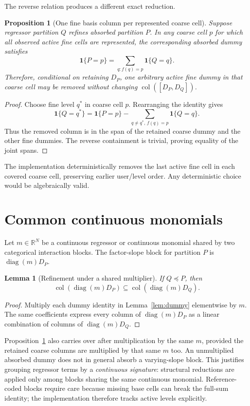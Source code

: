 \documentclass[11pt]{article}
\newtheorem{proposition}[theorem]{Proposition}
\newtheorem{lemma}[theorem]{Lemma}
\theoremstyle{definition}
\newcommand{\R}{\mathbb{R}}
\newcommand{\col}{\operatorname{col}}
\newcommand{\diag}{\operatorname{diag}}
\newcommand{\1}{\mathbf{1}}
\begin{document}
The reverse relation produces a different exact reduction.

\begin{proposition}[One fine basis column per represented coarse cell]\label{prop:basis}
Suppose regressor partition $Q$ refines absorbed partition $P$. In any coarse cell $p$ for which all observed active fine cells are represented, the corresponding absorbed dummy satisfies
\[
  \1\{P=p\}=\sum_{q:f(q)=p}\1\{Q=q\}.
\]
Therefore, conditional on retaining $D_P$, one arbitrary active fine dummy in that coarse cell may be removed without changing $\col([D_P,D_Q])$.
\end{proposition}
\begin{proof}
Choose fine level $q^*$ in coarse cell $p$. Rearranging the identity gives
\[
  \1\{Q=q^*\}=\1\{P=p\}-\sum_{q\ne q^*,\,f(q)=p}\1\{Q=q\}.
\]
Thus the removed column is in the span of the retained coarse dummy and the other fine dummies. The reverse containment is trivial, proving equality of the joint spans.
\end{proof}

The implementation deterministically removes the last active fine cell in each covered coarse cell, preserving earlier user/level order. Any deterministic choice would be algebraically valid.

\section{Common continuous monomials}

Let $m\in\R^N$ be a continuous regressor or continuous monomial shared by two categorical interaction blocks. The factor-slope block for partition $P$ is $\diag(m)D_P$.

\begin{lemma}[Refinement under a shared multiplier]\label{lem:slope}
If $Q\preceq P$, then
\[
  \col(\diag(m)D_P)\subseteq\col(\diag(m)D_Q).
\]
\end{lemma}
\begin{proof}
Multiply each dummy identity in Lemma~\ref{lem:dummy} elementwise by $m$. The same coefficients express every column of $\diag(m)D_P$ as a linear combination of columns of $\diag(m)D_Q$.
\end{proof}

Proposition~\ref{prop:basis} also carries over after multiplication by the same $m$, provided the retained coarse columns are multiplied by that same $m$ too. An unmultiplied absorbed dummy does not in general absorb a varying-slope block. This justifies grouping regressor terms by a \emph{continuous signature}: structural reductions are applied only among blocks sharing the same continuous monomial. Reference-coded blocks require care because missing base cells can break the full-sum identity; the implementation therefore tracks active levels explicitly.
\end{document}
